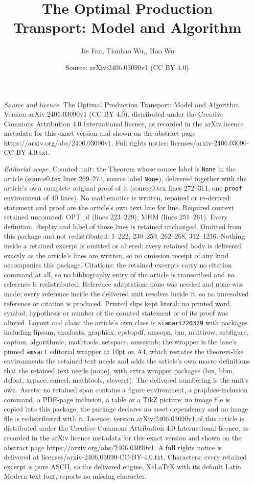 \documentclass[10pt,a4paper]{amsart}
\title[The Optimal Production Transport: Model and Algorithm]{The Optimal Production Transport: Model and Algorithm}
\author{Jie Fan, Tianhao Wu,, Hao Wu}
\date{Source: arXiv:2406.03090v1 (CC BY 4.0)}
\begin{document}
\maketitle

\noindent\emph{Source and licence.} The Optimal Production Transport: Model and Algorithm. Version arXiv:2406.03090v1 (CC BY 4.0), distributed under the Creative Commons Attribution 4.0 International licence, as recorded in the arXiv licence metadata for this exact version and shown on the abstract page https://arxiv.org/abs/2406.03090v1. Full rights notice: licenses/arxiv-2406.03090-CC-BY-4.0.txt.\par\smallskip

\noindent\textit{Editorial scope.} Counted unit: the Theorem whose source label is \texttt{None} in the article (source0.tex lines 269--271, source label \texttt{None}), delivered together with the article's own complete original proof of it (source0.tex lines 272--311, one \texttt{proof} environment of 40 lines). No mathematics is written, repaired or re-derived: statement and proof are the article's own text line for line. Required context retained uncounted: OPT\_d (lines 223--229); MRM (lines 251--261). Every definition, display and label of those lines is retained unchanged. Omitted from this package and not redistributed: 1--222, 230--250, 262--268, 312--1216. Nothing inside a retained excerpt is omitted or altered: every retained body is delivered exactly as the article's lines are written, so no omission receipt of any kind accompanies this package. Citations: the retained excerpts carry no citation command at all, so no bibliography entry of the article is transcribed and no reference is redistributed. Reference adaptation: none was needed and none was made; every reference inside the delivered unit resolves inside it, so no unresolved reference or citation is produced. Printed slips kept literal: no printed word, symbol, hypothesis or number of the counted statement or of its proof was altered. Layout and class: the article's own class is \texttt{siamart220329} with packages including lipsum, amsfonts, graphicx, epstopdf, amsopn, bm, multirow, subfigure, caption, algorithmic, mathtools, setspace, amssymb; the wrapper is the lane's pinned \texttt{amsart} editorial wrapper at 10pt on A4, which restates the theorem-like environments the retained text needs and adds the article's own macro definitions that the retained text needs (none), with extra wrapper packages (bm, bbm, dsfont, xspace, cancel, mathtools, cleveref). The delivered numbering is the unit's own. Assets: no retained span contains a figure environment, a graphics-inclusion command, a PDF-page inclusion, a table or a TikZ picture; no image file is copied into this package, the package declares no asset dependency and no image file is redistributed with it. Licence: version arXiv:2406.03090v1 of this article is distributed under the Creative Commons Attribution 4.0 International licence, as recorded in the arXiv licence metadata for this exact version and shown on the abstract page https://arxiv.org/abs/2406.03090v1. A full rights notice is delivered at licenses/arxiv-2406.03090-CC-BY-4.0.txt. Characters: every retained excerpt is pure ASCII, so the delivered engine, XeLaTeX with its default Latin Modern text font, reports no missing character.
\end{document}
